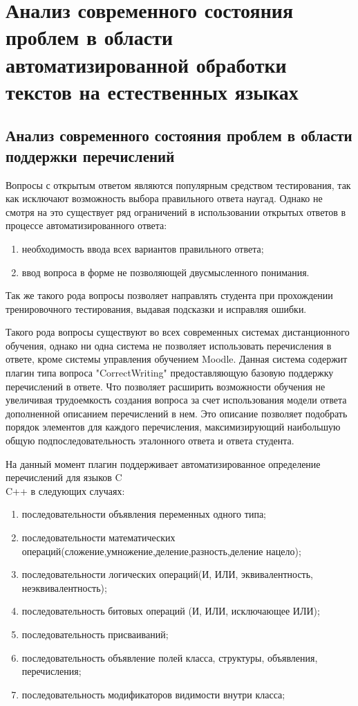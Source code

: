 \documentclass{standalone}
\begin{document}
\chapter{Анализ современного состояния проблем в области автоматизированной обработки текстов
на естественных языках}%
\ttl
\section{Анализ современного состояния проблем в области поддержки перечислений} %
\par Вопросы с открытым ответом являются популярным средством тестирования, так как исключают возможность выбора правильного ответа наугад.
Однако не смотря на это существует ряд ограничений в использовании открытых ответов в процессе автоматизированного ответа:
\begin{enumerate}
    \item необходимость ввода всех вариантов правильного ответа;
    \item ввод вопроса в форме не позволяющей двусмысленного понимания.
\end{enumerate}
Так же такого рода вопросы позволяет направлять студента при прохождении тренировочного тестирования, выдавая подсказки и исправляя ошибки.
\par Такого рода вопросы существуют во всех современных системах дистанционного обучения, однако ни одна система не позволяет использовать перечисления в ответе, кроме системы управления обучением Moodle.
Данная система содержит плагин типа вопроса "CorrectWriting" предоставляющую базовую поддержку перечислений в ответе. Что позволяет расширить возможности обучения не увеличивая трудоемкость создания вопроса за счет
использования модели ответа дополненной описанием перечислений в нем. Это описание позволяет подобрать порядок элементов для каждого перечисления, максимизирующий наибольшую общую подпоследовательность эталонного ответа и ответа студента.
\par На данный момент плагин поддерживает автоматизированное определение перечислений для языков C\\C++ в следующих случаях:
\begin{enumerate}
    \item последовательности объявления переменных одного типа;
    \item последовательности математических операций(сложение,умножение,деление,разность,деление нацело);
    \item последовательности логических операций(И, ИЛИ, эквивалентность, неэквивалентность);
    \item последовательность битовых операций (И, ИЛИ, исключающее ИЛИ);
    \item последовательность присваиваний;
    \item последовательность объявление полей класса, структуры, объявления, перечисления;
    \item последовательность модификаторов видимости внутри класса;
\end{enumerate}
\end{document}
